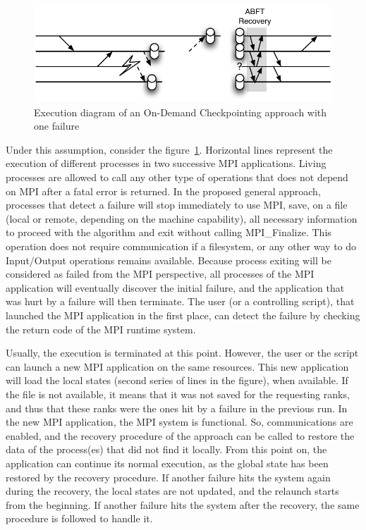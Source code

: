 \begin{figure}
\begin{center}
\includegraphics[width=.9\linewidth]{figures/idea.pdf}
\caption{Execution diagram of an On-Demand Checkpointing approach with
  one failure\label{fig:idea}}
\end{center}
\end{figure}

Under this assumption, consider the figure~\ref{fig:idea}. Horizontal
lines represent the execution of different processes in two successive
MPI applications. Living processes are allowed to call any other type
of operations that does not depend on MPI after a fatal error is
returned. In the proposed general approach, processes that detect a
failure will stop immediately to use MPI, save, on a file (local or
remote, depending on the machine capability), all necessary
information to proceed with the \abft algorithm and exit without
calling MPI\_Finalize. This operation does not require communication
if a filesystem, or any other way to do Input/Output operations remains
available. Because process exiting will be considered as failed from
the MPI perspective, all processes of the MPI application will
eventually discover the initial failure, and the application that was
hurt by a failure will then terminate. The user (or a controlling
script), that launched the MPI application in the first place, can
detect the failure by checking the return code of the MPI runtime
system.

Usually, the execution is terminated at this point. However, the user
or the script can launch a new MPI application on the same
resources. This new application will load the local states (second
series of lines in the figure), when available. If the file is not
available, it means that it was not saved for the requesting ranks,
and thus that these ranks were the ones hit by a failure in the
previous run. In the new MPI application, the MPI system is
functional. So, communications are enabled, and the recovery procedure
of the \abft approach can be called to restore the data of the
process(es) that did not find it locally. From this point on, the
application can continue its normal execution, as the global state has
been restored by the \abft recovery procedure. If another failure hits
the system again during the recovery, the local states are not
updated, and the relaunch starts from the beginning. If another
failure hits the system after the \abft recovery, the same procedure
is followed to handle it.

